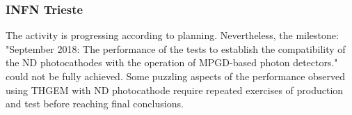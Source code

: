 \subsubsection{INFN Trieste} 
The activity is progressing according to  planning.
Nevertheless, the milestone: "September 2018: 
The performance of the tests to establish 
the compatibility of the ND photocathodes
with the operation of MPGD-based photon detectors."
could not be fully achieved. Some puzzling aspects 
of the performance observed using THGEM
with ND photocathode require repeated exercises
of production and test before reaching final conclusions.